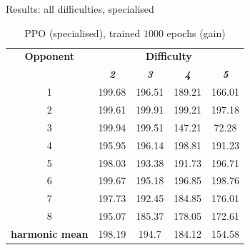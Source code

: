 \documentclass[boxes]{beamer}
\begin{document}
\begin{frame}{Results: all difficulties, specialised}
      \begin{table}[htbp]
      \caption{PPO (specialised), trained $1000$ epochs (gain)}
              \begin{center}
            \begin{tabular}{|c|c|c|c|c|}
                \hline
                \textbf{Opponent} & \multicolumn{4}{|c|}{\textbf{Difficulty}} \\
                \cline{2-5}
                & \textbf{\textit{2}} & \textbf{\textit{3}} & \textbf{\textit{4}} & \textbf{\textit{5}} \\
                \hline
                1                      & 199.68              & 196.51              & 189.21              & 166.01              \\
                2                      & 199.61              & 199.91              & 199.21              & 197.18              \\
                3                      & 199.94              & 199.51              & 147.21              & 72.28               \\
                4                      & 195.95              & 196.14              & 198.81              & 191.23              \\
                5                      & 198.03              & 193.38              & 191.73              & 196.71              \\
                6                      & 199.67              & 195.18              & 196.85              & 198.76              \\
                7                      & 197.73              & 192.45              & 184.85              & 176.01              \\
                8                      & 195.07              & 185.37              & 178.05              & 172.61              \\
                \hline
                \textbf{harmonic mean} & 198.19              & 194.7               & 184.12              & 154.58              \\
                \hline
            \end{tabular}
            \label{Specialized PPO against multiple difficulties (gain)}
        \end{center}
        \end{table}
\end{frame}
\end{document}
